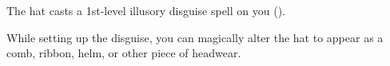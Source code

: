 





The hat casts a 1st-level illusory disguise spell on you ().

While setting up the disguise, you can magically alter the hat to appear as a comb, ribbon, helm, or other piece of headwear.

\vfill

\ItemBulk{-}
\hfill{}
